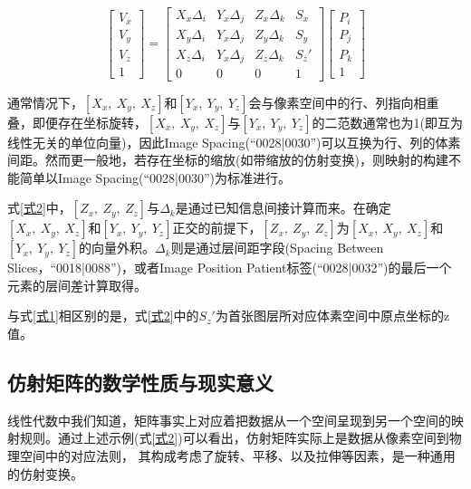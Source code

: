 \documentclass{ctexart}
\begin{document}
\begin{equation}\label{式2}
\left[\begin{array}{c}
V_x \\
V_y \\
V_z \\
1
\end{array}\right] = 
\left[\begin{array}{cccc}
X_x \Delta_i & Y_x \Delta_j & Z_x \Delta_k & S_x\\
X_y \Delta_i & Y_x \Delta_j & Z_y \Delta_k & S_y\\
X_z \Delta_i & Y_x \Delta_j & Z_z \Delta_k & {S_z}'\\
0 & 0 & 0 & 1
\end{array}\right]
\left[\begin{array}{c}
P_i \\
P_j \\
P_k \\
1
\end{array}\right]
\end{equation}

通常情况下，$[X_x,\ X_y,\ X_z]$和$[Y_x,\ Y_y,\ Y_z]$会与像素空间中的行、列指向相重叠，即便存在坐标旋转，$[X_x,\ X_y,\ X_z]$与$[Y_x,\ Y_y,\ Y_z]$的二范数通常也为1(即互为线性无关的单位向量)，因此Image Spacing(``0028|0030'')可以互换为行、列的体素间距。然而更一般地，若存在坐标的缩放(如带缩放的仿射变换)，则映射的构建不能简单以Image Spacing(``0028|0030'')为标准进行。\par

式\ref{式2}中，$[Z_x,\ Z_y,\ Z_z]$与$\Delta_k$是通过已知信息间接计算而来。在确定$[X_x,\ X_y,\ X_z]$和$[Y_x,\ Y_y,\ Y_z]$正交的前提下，$[Z_x,\ Z_y,\ Z_z]$为$[X_x,\ X_y,\ X_z]$和$[Y_x,\ Y_y,\ Y_z]$的向量外积。$\Delta_k$则是通过层间距字段(Spacing Between Slices，``0018|0088'')，或者Image Position Patient标签(``0028|0032'')的最后一个元素的层间差计算取得。\par

与式\ref{式1}相区别的是，式\ref{式2}中的${S_z}'$为首张图层所对应体素空间中原点坐标的z值。\par

\subsection{仿射矩阵的数学性质与现实意义}

线性代数中我们知道，矩阵事实上对应着把数据从一个空间呈现到另一个空间的映射规则。通过上述示例(式\ref{式2})可以看出，仿射矩阵实际上是数据从像素空间到物理空间中的对应法则， 其构成考虑了旋转、平移、以及拉伸等因素，是一种通用的仿射变换。\par
\end{document}
